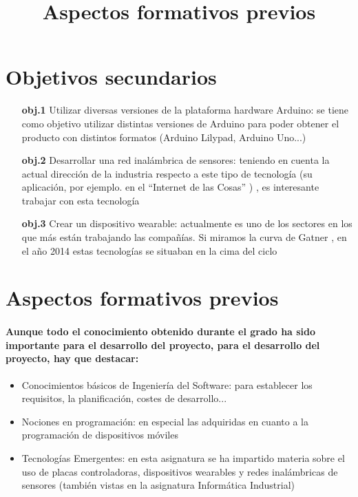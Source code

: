 \section{
Objetivos secundarios
}
  \begin{itemize}
    \item[\textbf{obj.1}]Utilizar diversas versiones de la plataforma hardware Arduino: se tiene como objetivo utilizar distintas versiones de Arduino para poder obtener el producto con distintos formatos (Arduino Lilypad, Arduino Uno...)
    \item[\textbf{obj.2}]Desarrollar una red inalámbrica de sensores: teniendo en cuenta la actual dirección de la industria respecto a este tipo de tecnología (su aplicación, por ejemplo. en el “Internet de las Cosas” \cite{hypeIoT} \cite{gatnercurve}) , es interesante trabajar con esta tecnología
    \item[\textbf{obj.3}]Crear un dispositivo wearable: actualmente es uno de los sectores en los que más están trabajando las compañías. Si miramos la curva de Gatner \cite{gatnercurve}, en el año 2014 estas tecnologías se situaban en la cima del ciclo
  \end{itemize}

\title{Aspectos formativos previos}
\section{
Aspectos formativos previos
}
\paragraph{
Aunque todo el conocimiento obtenido durante el grado ha sido importante para el desarrollo del proyecto, para el desarrollo del proyecto, hay que destacar:
}
  \begin{itemize}
    \item Conocimientos básicos de Ingeniería del Software: para establecer los requisitos, la planificación, costes de desarrollo...
    \item Nociones en programación: en especial las adquiridas en cuanto a la programación de dispositivos móviles
    \item Tecnologías Emergentes: en esta asignatura se ha impartido materia sobre el uso de placas controladoras, dispositivos wearables y redes inalámbricas de sensores (también vistas en la asignatura Informática Industrial)
  \end{itemize}
